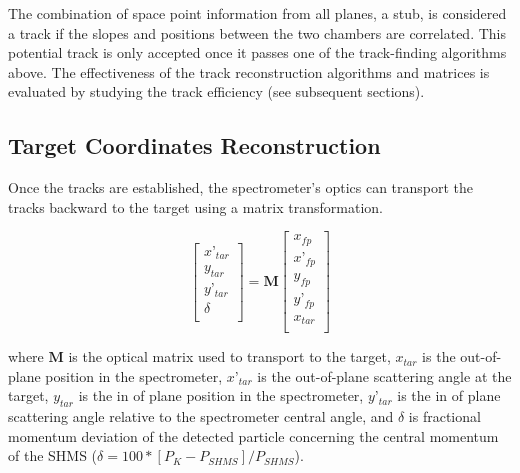 \documentclass[
]{report}
\begin{document}
The combination of space point information from all planes, a stub, is
considered a track if the slopes and positions between the two chambers
are correlated. This potential track is only accepted once it passes one
of the track-finding algorithms above. The effectiveness of the track
reconstruction algorithms and matrices is evaluated by studying the
track efficiency (see subsequent sections).

\hypertarget{target-coordinates-reconstruction}{%
\subsection{Target Coordinates
Reconstruction}\label{target-coordinates-reconstruction}}

Once the tracks are established, the spectrometer's optics can transport
the tracks backward to the target using a matrix transformation.

\begin{equation} 
  \begin{bmatrix}
    x’_{tar} \\
    y_{tar} \\
    y’_{tar} \\
    \delta \\
  \end{bmatrix}=\textbf{M}  \begin{bmatrix}
    x_{fp} \\
    x’_{fp} \\
    y_{fp} \\
    y’_{fp} \\
    x_{tar} \\
  \end{bmatrix}
  \label{eq:fp_transform} 
\end{equation}

\noindent where \(\textbf{M}\) is the optical matrix used to transport
to the target, \(x_{tar}\) is the out-of-plane position in the
spectrometer, \(x’_{tar}\) is the out-of-plane scattering angle at the
target, \(y_{tar}\) is the in of plane position in the spectrometer,
\(y’_{tar}\) is the in of plane scattering angle relative to the
spectrometer central angle, and \(\delta\) is fractional momentum
deviation of the detected particle concerning the central momentum of
the SHMS (\(\delta=100*[P_{K}-P_{SHMS}]/P_{SHMS}\)).

\label{Chapter-3-3}


\end{document}
